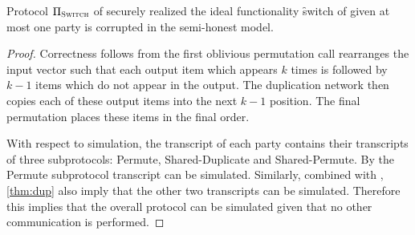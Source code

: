 \begin{theorem}\label{thm:switch}
	Protocol $\Pi_{\textsc{Switch}}$ of  securely realized the ideal functionality \f{switch} of  given at most one party is corrupted in the semi-honest  model.
\end{theorem}
\begin{proof}
	Correctness follows from the first oblivious permutation call rearranges the input vector such that each output item which appears $k$ times is followed by $k-1$ items which do not appear in the output. The duplication network then copies each of these output items into the next $k-1$ position. The final permutation places these items in the final order. 
	
	With respect to simulation, the transcript of each party contains their transcripts of three subprotocols: Permute, Shared-Duplicate and Shared-Permute. By  the Permute subprotocol transcript can be simulated. Similarly,  combined with ,\ref{thm:dup} also imply that the other two transcripts can be simulated. Therefore this implies that the overall protocol can be simulated given that no other communication is performed. 
		
\end{proof}
%
%
%
%
%
%			
%			
%
%			
%			
